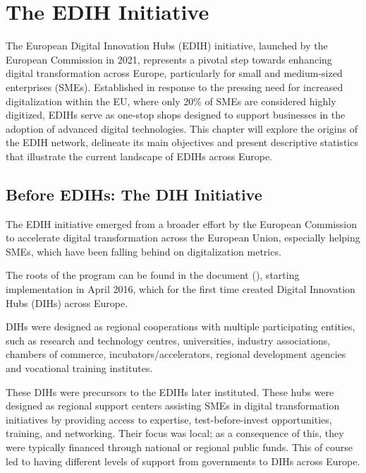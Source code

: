 \documentclass[12pt]{report}
\begin{document}
\newpage
\chapter{The EDIH Initiative}


\par The European Digital Innovation Hubs (EDIH) initiative, launched by the European Commission in 2021, represents a pivotal step towards enhancing digital transformation across Europe, particularly for small and medium-sized enterprises (SMEs). Established in response to the pressing need for increased digitalization within the EU, where only 20\% of SMEs are considered highly digitized, EDIHs serve as one-stop shops designed to support businesses in the adoption of advanced digital technologies. This chapter will explore the origins of the EDIH network, delineate its main objectives and present descriptive statistics that illustrate the current landscape of EDIHs across Europe. 


\section{Before EDIHs: The DIH Initiative}

\par The EDIH initiative emerged from a broader effort by the European Commission to accelerate digital transformation across the European Union, especially helping SMEs, which have been falling behind on digitalization metrics.
\par The roots of the program can be found in the  document (\cite{dei2016}), starting implementation in April 2016, which for the first time created Digital Innovation Hubs (DIHs) across Europe.
\par DIHs were designed as regional cooperations with multiple participating entities, such as research and technology centres, universities, industry associations, chambers of commerce, incubators/accelerators, regional development agencies and vocational training institutes.
\par These DIHs were precursors to the EDIHs later instituted. These hubs were designed as regional support centers assisting SMEs in digital transformation initiatives by providing access to expertise, test-before-invest opportunities, training, and networking. Their focus was local; as a consequence of this, they were typically financed through national or regional public funds. This of course led to having different levels of support from governments to DIHs across Europe.
\end{document}
